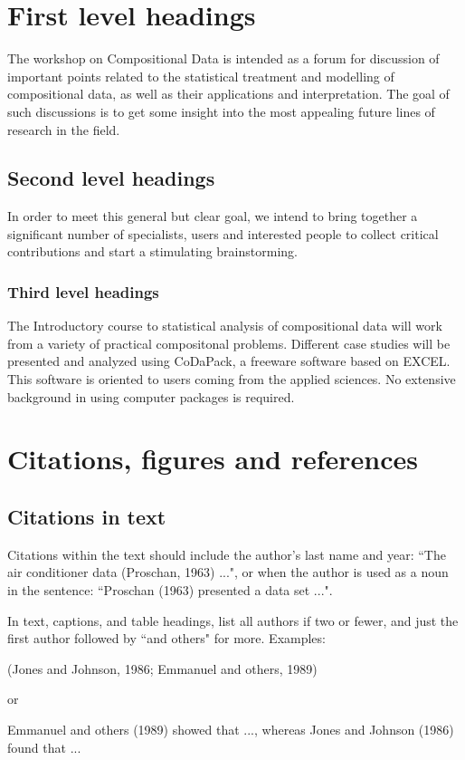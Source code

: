 \documentclass [10pt]{article}
\begin{document}
\section{First level headings}
\vskip-0.25cm The workshop on Compositional Data is intended as a
forum for discussion of important points related to the
statistical treatment and modelling of compositional data, as well
as their applications and interpretation. The goal of such
discussions is to get some insight into the most appealing future
lines of research in the field.

\subsection{Second level headings}
\vskip-0.25cm
In order to meet this general but clear goal, we
intend to bring together a significant number of specialists,
users and interested people to collect critical contributions and
start a stimulating brainstorming.

\subsubsection{Third level headings}
\vskip-0.25cm The Introductory course to statistical analysis of
compositional data will work from a variety of practical
compositonal problems. Different case studies will be presented
and analyzed using CoDaPack, a freeware software based on EXCEL.
This software is oriented to users coming from the applied
sciences. No extensive background in using computer packages is
required.


\section{Citations, figures and references}
\vskip-0.25cm
\subsection{Citations in text}
\vskip-0.25cm
Citations within the text should include the
author's last name and year: ``The air conditioner data (Proschan,
1963) ...", or when the author is used as a noun in the sentence:
``Proschan (1963) presented a data set ...".

In text, captions, and table headings, list all authors if two or
fewer, and just the first author followed by ``and others" for
more. Examples:

\begin{center}
(Jones and Johnson, 1986; Emmanuel and others, 1989)
\end{center}
or
\begin{center}
Emmanuel and others (1989) showed that ..., whereas Jones and
Johnson (1986) found that ...
\end{center}
\end{document}
